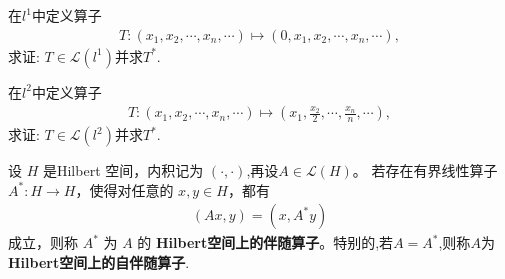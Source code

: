 \documentclass[../../main.tex]{subfiles}%
\begin{document}
\begin{example}
在$l^1$中定义算子
\begin{align*}
T:(x_1,x_2,\cdots,x_n,\cdots)\mapsto(0,x_1,x_2,\cdots,x_n,\cdots),
\end{align*}
求证: $T\in\mathscr{L}(l^1)$并求$T^*$.
\end{example}

\begin{example}
在$l^2$中定义算子
\begin{align*}
T:(x_1,x_2,\cdots,x_n,\cdots)\mapsto\left(x_1,\frac{x_2}{2},\cdots,\frac{x_n}{n},\cdots\right),
\end{align*}
求证: $T\in\mathscr{L}(l^2)$并求$T^*$.
\end{example}

\begin{definition}
设 \(H\) 是Hilbert 空间，内积记为 \((\cdot,\cdot)\),再设\(A \in \mathscr{L}(H)\)。
若存在有界线性算子 \(A^*: H \to H\)，使得对任意的 \(x, y \in H\)，都有
\begin{align*}
(Ax,y) = (x, A^*y)
\end{align*}
成立，则称 \(A^*\) 为 \(A\) 的 \textbf{Hilbert空间上的伴随算子}。特别的,若$A=A^*$,则称$A$为\textbf{Hilbert空间上的自伴随算子}.
\end{definition}
\end{document}
